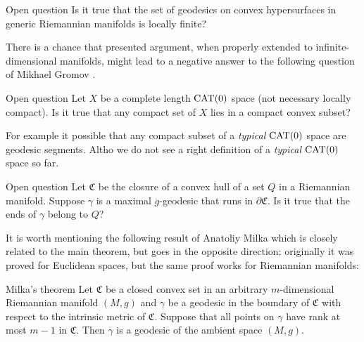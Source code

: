 \documentclass[a4paper,10pt]{article}
\begin{document}
\begin{thm}{Open question}
Is it true that the set of geodesics on convex hypersurfaces in generic Riemannian manifolds is locally finite?
\end{thm}

There is a chance that presented argument, when properly extended to infinite-dimensional manifolds, might lead to a negative answer to the following question of Mikhael Gromov \cite[6.B\textsubscript{1}(f)]{gromov-1993}.

\begin{thm}{Open question}
Let $X$ be a complete length $\operatorname{\rm CAT}(0)$ space (not necessary locally compact).
Is it true that any compact set of $X$ lies in a compact convex subset?
\end{thm}

For example it possible that any compact subset of a \emph{typical} $\operatorname{\rm CAT}(0)$ space are geodesic segments.
Altho we do not see a right definition of a \emph{typical} $\operatorname{\rm CAT}(0)$ space so far.

\begin{thm}{Open question}
Let $\mathfrak{C}$ be the closure of a convex hull of a set $Q$ in a Riemannian manifold.
Suppose $\gamma$ is a maximal $g$-geodesic that runs in $\partial \mathfrak{C}$.
Is it true that the ends of $\gamma$ belong to $Q$?
\end{thm}


It is worth mentioning the following result of Anatoliy Milka \cite[§~4]{milka} which is closely related to the main theorem, but goes in the opposite direction; originally it was proved for Euclidean spaces, but the same proof works for Riemannian manifolds:

\begin{thm}{Milka's theorem}
Let $\mathfrak{C}$ be a closed convex set in an arbitrary $m$-dimensional Riemannian manifold $(M,g)$ and $\gamma$ be a geodesic in the boundary of $\mathfrak{C}$ with respect to the intrinsic metric of $\mathfrak {C}$.
Suppose that all points on $\gamma$ have rank at most $m-1$ in $\mathfrak{C}$.
Then $\gamma$ is a geodesic of the ambient space $(M,g)$.
\end{thm}




\end{document}
